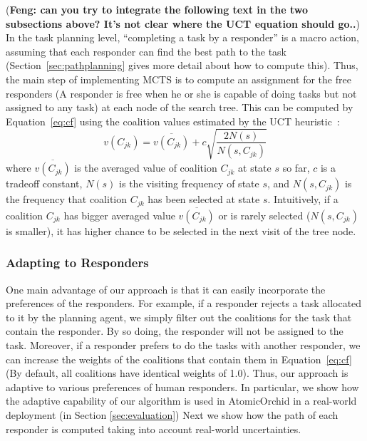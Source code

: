 (\textbf{Feng: can you try to integrate the following text in the two subsections above? It's not clear where the UCT equation should go..})
In the task planning level, ``completing a task by a responder'' is
a macro action, assuming that each responder can find the best path
to the task (Section~\ref{sec:pathplanning} gives more detail about
how to compute this). Thus, the main step of implementing MCTS is
to compute an assignment for the free responders (A responder is
free when he or she is capable of doing tasks but not assigned to
any task) at each node of the search tree. This can be computed by
Equation~\ref{eq:cf} using the coalition values estimated by the
UCT heuristic~\cite{?}:
\begin{equation}
  v(C_{jk}) = \overline{v(C_{jk})} + c\sqrt{\frac{2N(s)}{N(s, C_{jk})}}
\end{equation}
where $\overline{v(C_{jk})}$ is the averaged value of coalition
$C_{jk}$ at state $s$ so far, $c$ is a tradeoff constant, $N(s)$ is
the visiting frequency of state $s$, and $N(s, C_{jk})$ is the
frequency that coalition $C_{jk}$ has been selected at state $s$.
Intuitively, if a coalition $C_{jk}$ has bigger averaged value
$\overline{v(C_{jk})}$ or is rarely selected ($N(s, C_{jk})$ is
smaller), it has higher chance to be selected in the next visit of
the tree node.

\subsubsection{Adapting to Responders}
One main advantage of our approach is that
it can easily incorporate the preferences of the
responders. For example, if a responder rejects  a task allocated to it by the planning agent, we
simply filter out the coalitions for the task that contain the
responder. By so doing, the responder will not be assigned to the
task. Moreover, if a responder prefers to do the tasks with another
responder, we can increase the weights of the coalitions that contain
them in Equation~\ref{eq:cf} (By default, all coalitions have
identical weights of 1.0). Thus, our approach is adaptive to
various preferences of human responders. In particular, we show how the adaptive capability of our algorithm is used in AtomicOrchid in a real-world deployment (in Section \ref{sec:evaluation})
Next we show how the path of each responder is computed taking into account real-world uncertainties.

